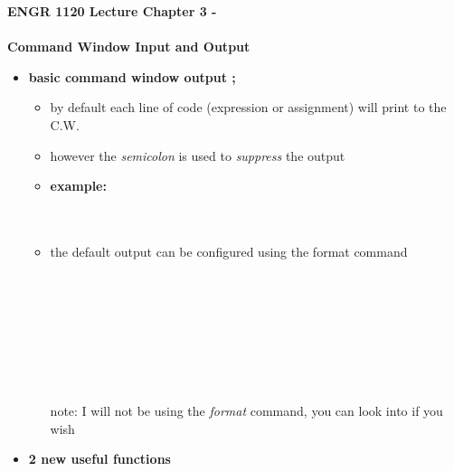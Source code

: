 \documentclass[11pt]{article}
\newcommand{\NUM}{3 }
\begin{document}
\textbf{ \LARGE ENGR 1120 Lecture Chapter \NUM - \\\\ Command Window Input and Output} \\

\begin{itemize}

	\item \textbf{ \LARGE basic command window output ;}\\
		\Large
		\begin{itemize}
			\item by default each line of code (expression or assignment) will print to the C.W. \\ \vspace{20mm}
			\item however the {\it semicolon} is used to {\it suppress} the output\\ 
			\item {\bf example:} \\
			
				 \\\\
				
			\item the default output can be configured using the format command\\
		
				  \\\\
				  \\\\
				  \\\\
				  \\\\
					
			note: I will not be using the {\it format} command, you can look into if you wish\\		
		\end{itemize}
		
		\newpage
	\item \textbf{ \LARGE 2 new useful functions}\\
	
		
		\begin{itemize}
		

\end{itemize}
\end{itemize}
\end{document}
